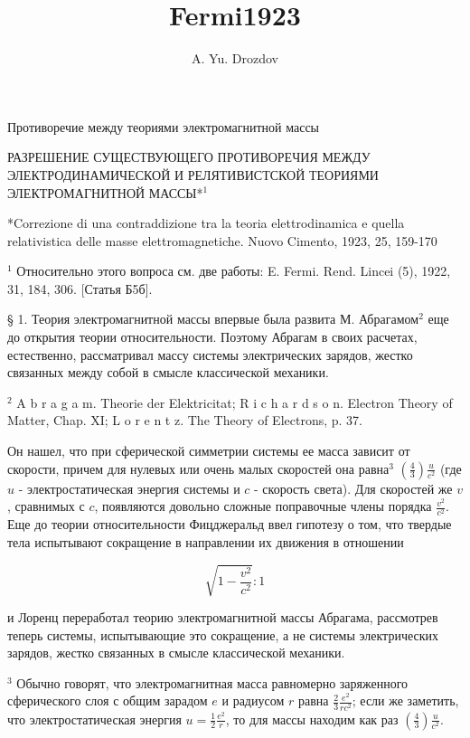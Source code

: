 \documentclass[11pt]{article}
\author{A. Yu. Drozdov}
\title{Fermi1923}
\begin{document}
    \maketitle

    Противоречие между теориями электромагнитной массы

    РАЗРЕШЕНИЕ СУЩЕСТВУЮЩЕГО ПРОТИВОРЕЧИЯ МЕЖДУ ЭЛЕКТРОДИНАМИЧЕСКОЙ И
РЕЛЯТИВИСТСКОЙ ТЕОРИЯМИ ЭЛЕКТРОМАГНИТНОЙ МАССЫ*\(^1\)

    *Correzione di una contraddizione tra la teoria elettrodinamica e quella
relativistica delle masse elettromagnetiche. Nuovo Cimento, 1923, 25,
159-170

    \(^1\) Относительно этого вопроса см. две работы: E. Fermi. Rend. Lincei
(5), 1922, 31, 184, 306. {[}Статья Б5б{]}.

    § 1. Теория электромагнитной массы впервые была развита М.
Абрагамом\(^2\) еще до открытия теории относительности. Поэтому Абрагам
в своих расчетах, естественно, рассматривал массу системы электрических
зарядов, жестко связанных между собой в смысле классической механики.

    \(^2\) A b r a g a m. Theorie der Elektricitat; R i c h a r d s o n.
Electron Theory of Matter, Chap. XI; L o r e n t z. The Theory of
Electrons, p. 37.

    Он нашел, что при сферической симметрии системы ее масса зависит от
скорости, причем для нулевых или очень малых скоростей она равна\(^3\)
\(\left(\frac{4}{3}\right) \frac{u}{c^2}\) (где \(u\) -
электростатическая энергия системы и \(c\) - скорость света). Для
скоростей же \(v\), сравнимых с \(c\), появляются довольно сложные
поправочные члены порядка \(\frac{v^2}{c^2}\). Еще до теории
относительности Фицджеральд ввел гипотезу о том, что твердые тела
испытывают сокращение в направлении их движения в отношении

\[\sqrt{1-\frac{v^2}{c^2}}:1\]

    и Лоренц переработал теорию электромагнитной массы Абрагама, рассмотрев
теперь системы, испытывающие это сокращение, а не системы электрических
зарядов, жестко связанных в смысле классической механики.

    \(^3\) Обычно говорят, что электромагнитная масса равномерно заряженного
сферического слоя с общим зарадом \(e\) и радиусом \(r\) равна
\(\frac{2}{3} \frac{e^2}{r c^2}\); если же заметить, что
электростатическая энергия \(u = \frac{1}{2} \frac{e^2}{r}\), то для
массы находим как раз \(\left(\frac{4}{3}\right) \frac{u}{c^2}\).
\end{document}
